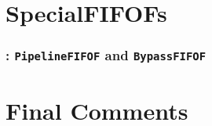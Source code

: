 
\section{SpecialFIFOFs}

\begin{frame}[fragile]
\frametitle{{\BSV}: {\tt PipelineFIFOF} and {\tt BypassFIFOF}}

\label{Slide_SpecialFIFOFs}

\footnotesize

\end{frame}


\section{Final Comments}

